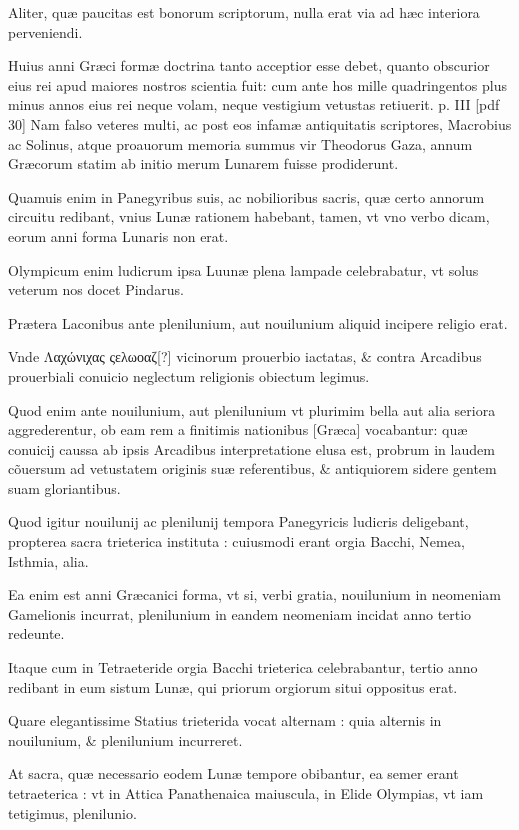 \begin{parnumbers}
Aliter, quæ paucitas est bonorum scriptorum, nulla erat via ad hæc interiora perveniendi.

Huius anni Græci formæ doctrina tanto acceptior esse debet, quanto obscurior eius rei apud maiores nostros scientia fuit: cum ante hos mille quadringentos plus minus annos eius rei neque volam, neque vestigium vetustas retiuerit.
\clearpage
p. III [pdf 30]
Nam falso veteres multi, ac post eos infamæ 
antiquitatis scriptores, Macrobius ac Solinus, atque proauorum memoria summus vir Theodorus Gaza, annum Græcorum statim ab initio merum Lunarem fuisse prodiderunt.

Quamuis enim in Panegyribus suis, ac nobilioribus sacris, quæ certo annorum circuitu redibant, vnius Lunæ rationem habebant, tamen, vt vno verbo dicam, eorum anni forma Lunaris non erat.

Olympicum enim ludicrum ipsa Luunæ plena lampade celebrabatur, vt solus veterum nos docet Pindarus. 

Prætera Laconibus ante plenilunium, aut nouilunium aliquid incipere religio erat.

Vnde \textgreek{Λαχώνιχας ςελωοαζ}[?] vicinorum prouerbio iactatas, \& contra Arcadibus prouerbiali conuicio neglectum religionis obiectum legimus. 

Quod enim ante nouilunium, aut plenilunium vt plurimim bella aut alia seriora aggrederentur, ob eam rem a finitimis nationibus [Græca] vocabantur: quæ conuicij caussa ab ipsis Arcadibus interpretatione elusa est, probrum in laudem cõuersum ad vetustatem originis suæ referentibus, \& antiquiorem sidere gentem suam gloriantibus. 

Quod igitur nouilunij ac plenilunij tempora Panegyricis ludicris deligebant, propterea sacra trieterica instituta : cuiusmodi erant orgia Bacchi, Nemea, Isthmia, alia.

Ea enim est anni Græcanici forma, vt si, verbi gratia, nouilunium in neomeniam Gamelionis incurrat, plenilunium in eandem neomeniam incidat anno tertio redeunte.

Itaque cum in Tetraeteride orgia Bacchi trieterica celebrabantur, tertio anno redibant in eum sistum Lunæ, qui priorum orgiorum situi oppositus erat.

Quare elegantissime Statius trieterida vocat alternam : quia alternis in nouilunium, \& plenilunium incurreret.

At sacra, quæ necessario eodem Lunæ tempore obibantur, ea semer erant tetraeterica : vt in Attica Panathenaica maiuscula, in Elide Olympias, vt iam tetigimus, plenilunio.


\end{parnumbers}
